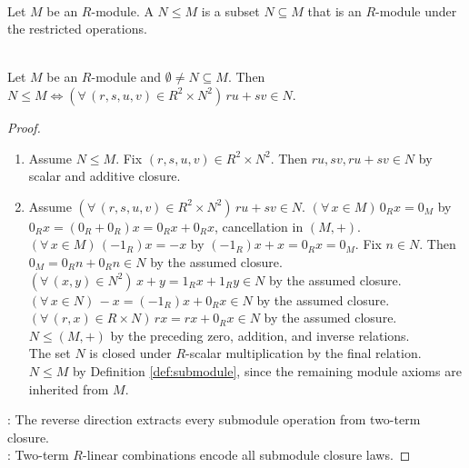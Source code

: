 \begin{definition} \label{def:submodule} \\
Let $M$ be an $R$-module. A  $N\leq M$ is a subset $N\subseteq M$ that is an $R$-module under the restricted operations.
\end{definition}

\begin{theorem} \label{thm:submodule-test} \\
Let $M$ be an $R$-module and $\emptyset\neq N\subseteq M$. Then $N\leq M\Longleftrightarrow(\forall\,(r,s,u,v)\in R^2\times N^2)\,ru+sv\in N$.
\begin{proof}
\begin{enumerate}[label=\roman*.]
\setlength{\itemsep}{0pt}
\item[$(\Rightarrow)$] Assume $N\leq M$. Fix $(r,s,u,v)\in R^2\times N^2$. Then $ru,sv,ru+sv\in N$ by scalar and additive closure.
\item[$(\Leftarrow)$] Assume $(\forall\,(r,s,u,v)\in R^2\times N^2)\,ru+sv\in N$. $(\forall\,x\in M)\,0_Rx=0_M$ by $0_Rx=(0_R+0_R)x=0_Rx+0_Rx$, cancellation in $(M,+)$.\\
$(\forall\,x\in M)\,(-1_R)x=-x$ by $(-1_R)x+x=0_Rx=0_M$. Fix $n\in N$. Then $0_M=0_Rn+0_Rn\in N$ by the assumed closure.\\
$(\forall\,(x,y)\in N^2)\,x+y=1_Rx+1_Ry\in N$ by the assumed closure. $(\forall\,x\in N)\,-x=(-1_R)x+0_Rx\in N$ by the assumed closure.\\
$(\forall\,(r,x)\in R\times N)\,rx=rx+0_Rx\in N$ by the assumed closure. $N\leq(M,+)$ by the preceding zero, addition, and inverse relations.\\
The set $N$ is closed under $R$-scalar multiplication by the final relation.\\
$N\leq M$ by Definition \ref{def:submodule}, since the remaining module axioms are inherited from $M$.
\end{enumerate}
: The reverse direction extracts every submodule operation from two-term closure.\\
: Two-term $R$-linear combinations encode all submodule closure laws.
\end{proof}
\end{theorem}

